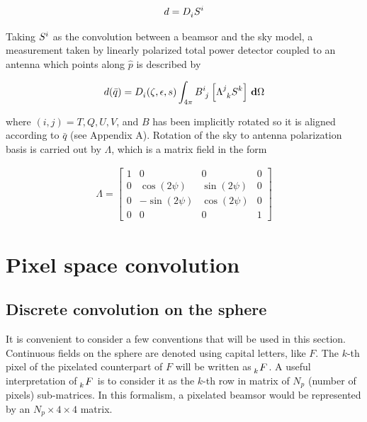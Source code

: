 \documentclass[a4paper,11pt]{article}
\begin{document}
\begin{equation}
\begin{aligned}
d = \tensor{D}{_{i}} \tensor{S}{^{i}}
\end{aligned}
\label{eq::total_power_measurement}
\end{equation}

\noindent
Taking $\tensor{S}{^{i}}$ as the convolution between a beamsor and the sky model, a measurement taken by linearly polarized total power detector coupled to an antenna which points along $\hat{p}$ is described by

\begin{equation}
\begin{aligned}
d(\bar{q}) = \tensor{D}{_{i}}(\zeta,\epsilon,s) \int_{4\pi} \tensor{B}{^{i}_{j} } \left[ \tensor{\Lambda}{^{j}_{k} } \tensor{S}{^{k}} \right ] \, \mathbf{d} \Omega
\end{aligned}
\label{eq::total_power}
\end{equation}

\noindent
where $(i,j) = T,Q,U,V$, and $B$ has been implicitly rotated so it is aligned according to $\bar{q}$ (see Appendix A). Rotation of the sky to antenna polarization basis is carried out by $\Lambda$, which is a matrix field in the form

\begin{equation}
\begin{aligned}
\Lambda =
\begin{bmatrix}
1  & 0 & 0 & 0\\
0  & \cos(2\psi) & \sin(2\psi) & 0\\
0  &-\sin(2\psi) & \cos(2\psi) & 0\\
0  & 0 & 0 & 1
\end{bmatrix}
\end{aligned}
\label{eq::lambda_operator}
\end{equation}

%
\section{Pixel space convolution}
\label{sec::pixel_conv}

\subsection{Discrete convolution on the sphere}

It is convenient to consider a few conventions that will be used in this section. Continuous fields on the sphere are denoted using capital letters, like $F$. The $k$-th pixel of the pixelated counterpart of $F$ will be written as $\tensor[_k]{F}{}$. A useful interpretation of $\tensor[_k]{F}{}$ is to consider it as the $k$-th row in matrix of $N_p$ (number of pixels) sub-matrices. In this formalism, a pixelated beamsor would be represented by an $N_p \times 4 \times 4$ matrix.
\end{document}
